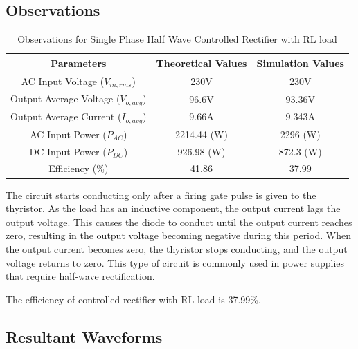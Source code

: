 \subsection{Observations}

\begin{table}[h]
    \renewcommand{\arraystretch}{1.3}
    \label{table_observation_6}
    \centering
    \begin{tabular}{|c|c|c|}
        \hline
        Parameters                              & Theoretical Values & Simulation Values \\
        \hline
        \hline
        AC Input Voltage ($ V_{in,rms} $)       & 230V               & 230V              \\
        \hline
        Output Average Voltage ($ V_{o,avg} $)  & 96.6V              & 93.36V            \\
        \hline
        Output Average Current ($ I_{o,avg}  $) & 9.66A              & 9.343A            \\
        \hline
        AC Input Power ($ P_{AC}  $)            & 2214.44 (W)        & 2296 (W)          \\
        \hline
        DC Input Power ($ P_{DC}  $)            & 926.98 (W)         & 872.3 (W)         \\
        \hline
        Efficiency (\%)                         & 41.86              & 37.99             \\
        \hline
    \end{tabular}
    \caption{Observations for Single Phase Half Wave Controlled Rectifier with RL load}

\end{table}


The circuit starts conducting only after a firing gate pulse is given to the thyristor. As the load has an inductive component, the output current lags the output voltage. This causes the diode to conduct until the output current reaches zero, resulting in the output voltage becoming negative during this period. When the output current becomes zero, the thyristor stops conducting, and the output voltage returns to zero. This type of circuit is commonly used in power supplies that require half-wave rectification.

The efficiency of controlled
rectifier with RL load is 37.99\%.



\subsection{Resultant Waveforms}

